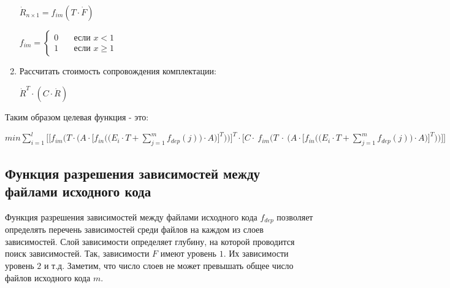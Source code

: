\begin{enumerate}
  \begin{center}
    $\dot{R}_{n \times 1} = f_{im}(T \cdot \dot{F})$
  \end{center}
  \begin{center}
    $
    f_{im} =
    \begin{cases}
      0 & \quad \text{если } x < 1 \\
      1 & \quad \text{если } x \geq 1
    \end{cases}
    $
  \end{center}
  \item Рассчитать стоимость сопровождения комплектации:
  \begin{center}
    $\dot{R}^{T} \cdot (C \cdot \dot{R})$
  \end{center}
\end{enumerate}

Таким образом целевая функция - это:
  \begin{center}
    $\displaystyle min \sum^{l}_{i = 1} \Bigg[\Bigg[f_{im}\Bigg(T \cdot \bigg(A \cdot \bigg[f_{in}\Big(\big(E_{i} \cdot T + \sum^{m}_{j = 1}f_{dep}(j)\big) \cdot A\Big)\bigg]^{T}\bigg)\Bigg)\Bigg]^{T} \cdot \Bigg[C \cdot~f_{im}\Bigg(T~\cdot~\bigg(A \cdot \bigg[f_{in}\Big(\big(E_{i} \cdot T + \sum^{m}_{j = 1}f_{dep}(j)\big) \cdot A\Big)\bigg]^{T}\bigg)\Bigg)\Bigg]\Bigg]$
  \end{center}

\subsection*{Функция разрешения зависимостей между файлами исходного кода}
Функция разрешения зависимостей между файлами исходного кода $f_{dep}$ позволяет определять перечень зависимостей среди файлов на каждом из слоев зависимостей. Слой зависимости определяет глубину, на которой проводится поиск зависимостей. Так, зависимости $F$ имеют уровень $1$. Их зависимости уровень $2$ и т.д. Заметим, что число слоев не может превышать общее число файлов исходного кода $m$.

